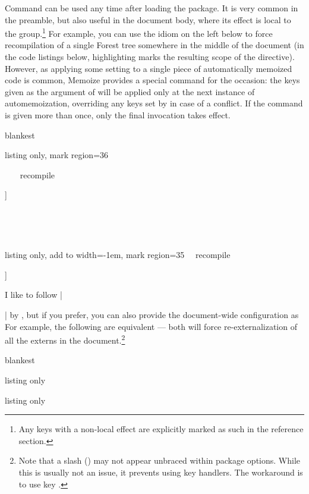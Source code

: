 \documentclass[a4paper,11pt]{article}
\begin{document}
Command  can be used any time after loading the package.  It is
very common in the preamble, but also useful in the document body, where its
effect is local to the  group.\footnote{Any keys with a non-local
  effect are explicitly marked as such in the reference section.} For example,
you can use the idiom on the left below to force recompilation of a single
Forest tree somewhere in the middle of the document (in the code listings
below, highlighting marks the resulting scope of the 
directive).  However, as applying some setting to a single piece of
automatically memoized code is common, Memoize provides a special command for
the occasion: the keys given as the argument of  will be
applied only at the next instance of automemoization, overriding any keys set
by  in case of a conflict.  If the command is given more than
once, only the final invocation takes effect.

\begin{tcboxedraster}[raster columns=2, raster equal height=rows, raster force size=false]{blankest}
\begin{tcblisting}{listing only, mark region={3}{6}}
~{~
  ~\mmzset~{recompile}
  \begin{forest}
    [VP[V][DP]]
  \end{forest}
~}~
\end{tcblisting}
\begin{tcblisting}{listing only, add to width=-1em, mark region={3}{5}}
~\mmznext~{recompile}
\begin{forest}
  [VP[V][DP]]
\end{forest}

\end{tcblisting} 
\end{tcboxedraster}

I like to follow |\usepackage{memoize}| by , but if you prefer,
you can also provide the document-wide configuration as 
For example, the following are equivalent --- both will force
re-externalization of all the externs in the document.\footnote{Note that a
  slash (\code{/}) may not appear unbraced within package options.  While this
  is usually not an issue, it prevents using  key handlers.  The
  workaround is to use key .}

\begin{tcboxedraster}[raster columns=2, raster equal height=rows]{blankest}
  \begin{tcblisting}{listing only}
\usepackage{memoize}
  \end{tcblisting}
  \begin{tcblisting}{listing only}
\usepackage[recompile]{memoize}
  \end{tcblisting}
\end{tcboxedraster}
\end{document}

